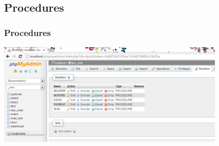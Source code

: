 \documentclass[12pt]{beamer}
\begin{document}
\subsection{Procedures}
\begin{frame}[c]
\frametitle{Procedures}
\centering
   \includegraphics[width=11cm, height=5cm]{images/procedures}

\end{frame}

\end{document}
